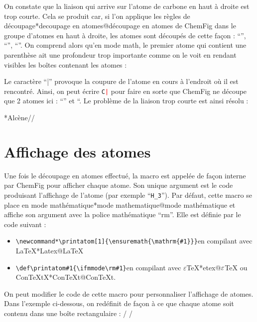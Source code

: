 \documentclass[10pt]{article}
\makeatletter
\newcommand\idx{\@ifstar{\let\print@or@not\@gobble\idx@}{\let\print@or@not\@firstofone\idx@}}
\newcommand\idx@[1]{%
	\ifcat\expandafter\noexpand\@car#1\@nil\relax%
		\expandafter\ifx\@car#1\@nil\protect
			\index{#1}%
			\print@or@not{#1}%
		\else
			\saveexpandmode\expandarg
			\StrSubstitute{\string#1}{\string @}{\@empty\protect\symbol{'100}}[\temp@]%
			\StrGobbleLeft\temp@1[\temp@]%
			\restoreexpandmode
			\expandafter\index\expandafter{\temp@ @\protect\texttt{\protect\textbackslash\temp@}}%
			\print@or@not{\texttt{\string#1}}%
		\fi
	\else
		\index{#1}%
		\print@or@not{#1}%
	\fi
}
\newcommand\make@car@active[2]{%
	\catcode`#1\active
	\begingroup
		\lccode`\~`#1\relax
		\lowercase{\endgroup\def~{#2}}%
}
\newif\if@exstar
\newcommand\exemple{%
	\begingroup
	\parskip\z@
	\@makeother\;\@makeother\!\@makeother\?\@makeother\:%
	\@ifstar{\@exstartrue\exemple@}{\@exstarfalse\exemple@}}
\newcommand\exemple@[2][65]{%
	\medbreak\noindent
	\begingroup
		\let\do\@makeother\dospecials
		\make@car@active\ { {}}%
		\make@car@active\^^M{\par\leavevmode}%
		\make@car@active\,{\leavevmode\kern\z@\string,}%
		\make@car@active\-{\leavevmode\kern\z@\string-}%
		\make@car@active\>{\leavevmode\kern\z@\string>}%
		\make@car@active\<{\leavevmode\kern\z@\string<}%
		\exemple@@{#1}{#2}%
}
\newcommand\exemple@@[3]{%
	\def\@tempa##1#3{\exemple@@@{#1}{#2}{##1}}%
	\@tempa
}
\newcommand\exemple@@@[3]{%
	\xdef\the@code{#3}%
	\endgroup
	\if@exstar
		\begingroup
			\fboxrule0.4pt
			\let\breakboxparindent\z@
			\def\bkvz@bottom{\hrule\@height\fboxrule}%
			\let\bkvz@before@breakbox\relax
			\def\bkvz@set@linewidth{\advance\linewidth\dimexpr-2\fboxrule-2\fboxsep}%
			\def\bkvz@left{\vrule\@width\fboxrule\hskip\fboxsep}%
			\def\bkvz@right{\hskip\fboxsep\vrule\@width\fboxrule}%
			\def\bkvz@top{\hbox to \hsize{%
				\vrule\@width\fboxrule\@height\fboxrule
				\leaders\bkvz@bottom\hfill
				\ECFAugie
				\fboxsep\z@
				\colorbox{black}{\kern0.25em\color{white}\footnotesize\lower0.5ex\hbox{\strut#2}\kern0.25em}%
				\leaders\bkvz@bottom\hfill
				\vrule\@width\fboxrule\@height\fboxrule}}%
			\breakbox
				\kern.5ex\relax
				\ttfamily\footnotesize\the@code\par
				\normalfont
				\kern3pt
				\hrule height0.1pt width\linewidth depth0.1pt
				\vskip5pt
				\rightskip0pt plus 1fill
				\everypar{{\color{lightgray}\rlap{\vrule height0.1pt width\linewidth depth0.1pt}}\hskip0pt plus 1fill}%
				\newlinechar`\^^M\everyeof{\noexpand}\scantokens{#3}\par
			\endbreakbox
		\endgroup
	\else
		\vskip0.5ex
		\boxput*(0,1)
			{\fboxsep\z@
			\hbox{\ECFAugie\colorbox{black}{\leavevmode\kern0.25em{\color{white}\footnotesize\strut#2}\kern0.25em}}%
			}%
			{\fboxsep5pt
			\fbox{%
				$\vcenter{\hsize\dimexpr0.#1\linewidth-\fboxsep-\fboxrule\relax
					\kern5pt\parskip0pt \ttfamily\footnotesize\the@code}%
				\vcenter{\kern5pt\hsize\dimexpr\linewidth-0.#1\linewidth-\fboxsep-\fboxrule\relax
					\everypar{{\color{lightgray}\rlap{\vrule height0.1pt width\dimexpr\linewidth-0.#1\linewidth-\fboxsep-\fboxrule depth0.1pt}}}%
					\footnotesize\newlinechar`\^^M\everyeof{\noexpand}\scantokens{#3}}$%
				}%
			}%
	\fi
	\medbreak
	\endgroup
}
\let\do\@makeother\dospecials
\newcommand\CF{{\ECFAugie ChemFig}\xspace}
\makeatother
\begin{document}
On constate que la liaison qui arrive sur l'atome de carbone en haut à droite est trop courte. Cela se produit car, si l'on applique les règles de découpage\idx*{decoupage en atomes@découpage en atomes} de \CF dans le groupe d'atomes en haut à droite, les atomes sont découpés de cette façon : ``\texttt{}'', ``\texttt{}'', ``\texttt{}''. On comprend alors qu'en mode math, le premier atome qui contient une parenthèse ait une profondeur trop importante comme on le voit en rendant visibles les boîtes contenant les atomes :
\begin{center}
\fboxsep=0pt
\renewcommand*\printatom[1]{\fbox{\ensuremath{\mathrm{#1}}}}%
%
\end{center}
Le caractère ``|'' provoque la coupure de l'atome en cours à l'endroit où il est rencontré. Ainsi, on peut écrire \texttt{C\textcolor{red}{|}} pour faire en sorte que \CF ne découpe que 2 atomes ici : ``\texttt{}'' et ``\texttt{}. Le problème de la liaison trop courte est ainsi résolu :

\exemple*{Alcène}//

\section{Affichage des atomes}\label{perso.affichage}
Une fois le découpage en atomes effectué, la macro \idx{\printatom} est appelée de façon interne par \CF pour afficher chaque atome. Son unique argument est le code produisant l'affichage de l'atome (par exemple ``\verb-H_3-''). Par défaut, cette macro se place en mode mathématique\idx*{mode mathematique@mode mathématique} et affiche son argument avec la police mathématique ``rm''. Elle est définie par le code suivant :
\begin{itemize}
	\item \verb|\newcommand*\printatom[1]{\ensuremath{\mathrm{#1}}}|\qquad en compilant avec \LaTeX{}\idx*{Latex@\protect\LaTeX}
	\item \verb|\def\printatom#1{\ifmmode\rm#1\else$\rm#1$\fi}|\qquad en compilant avec $\varepsilon$\TeX{}\idx*{etex@$\protect\varepsilon$\protect\TeX} ou Con\TeX tX\idx*{ConTeXt@Con\protect\TeX{}t}.
\end{itemize}\medskip

On peut modifier le code de cette macro pour personnaliser l'affichage de atomes. Dans l'exemple ci-dessous, on redéfinit \idx{\printatom} de façon à ce que chaque atome soit contenu dans une boîte rectangulaire :
\exemple{Redéfinition de \string\printatom}/\fboxsep=1pt
\renewcommand*\printatom[1]{\fbox{\ensuremath{\mathrm{#1}}}}
/
\end{document}
